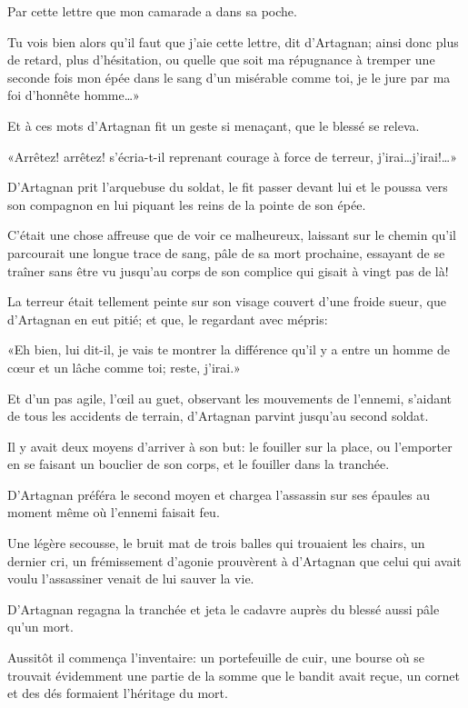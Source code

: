 \speak  Par cette lettre que mon camarade a dans sa poche. 

\speak  Tu vois bien alors qu'il faut que j'aie cette lettre, dit d'Artagnan; ainsi donc plus de retard, plus d'hésitation, ou quelle que soit ma répugnance à tremper une seconde fois mon épée dans le sang d'un misérable comme toi, je le jure par ma foi d'honnête homme\dots» 

Et à ces mots d'Artagnan fit un geste si menaçant, que le blessé se releva. 

«Arrêtez! arrêtez! s'écria-t-il reprenant courage à force de terreur, j'irai\dots j'irai!\dots» 

D'Artagnan prit l'arquebuse du soldat, le fit passer devant lui et le poussa vers son compagnon en lui piquant les reins de la pointe de son épée. 

C'était une chose affreuse que de voir ce malheureux, laissant sur le chemin qu'il parcourait une longue trace de sang, pâle de sa mort prochaine, essayant de se traîner sans être vu jusqu'au corps de son complice qui gisait à vingt pas de là! 

La terreur était tellement peinte sur son visage couvert d'une froide sueur, que d'Artagnan en eut pitié; et que, le regardant avec mépris: 

«Eh bien, lui dit-il, je vais te montrer la différence qu'il y a entre un homme de cœur et un lâche comme toi; reste, j'irai.» 

Et d'un pas agile, l'œil au guet, observant les mouvements de l'ennemi, s'aidant de tous les accidents de terrain, d'Artagnan parvint jusqu'au second soldat. 

Il y avait deux moyens d'arriver à son but: le fouiller sur la place, ou l'emporter en se faisant un bouclier de son corps, et le fouiller dans la tranchée. 

D'Artagnan préféra le second moyen et chargea l'assassin sur ses épaules au moment même où l'ennemi faisait feu. 

Une légère secousse, le bruit mat de trois balles qui trouaient les chairs, un dernier cri, un frémissement d'agonie prouvèrent à d'Artagnan que celui qui avait voulu l'assassiner venait de lui sauver la vie. 

D'Artagnan regagna la tranchée et jeta le cadavre auprès du blessé aussi pâle qu'un mort. 

Aussitôt il commença l'inventaire: un portefeuille de cuir, une bourse où se trouvait évidemment une partie de la somme que le bandit avait reçue, un cornet et des dés formaient l'héritage du mort. 

